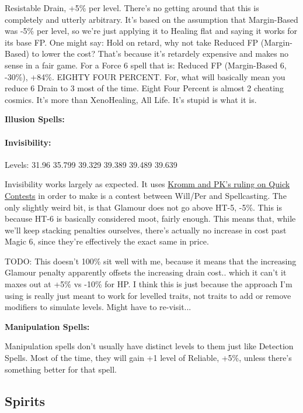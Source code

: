 \begin{multicols*}{2}
	Resistable Drain, +5\% per level. There's no getting around that this is completely and utterly arbitrary. It's based on the assumption that Margin-Based was -5\% per level, so we're just applying it to Healing flat and saying it works for its base FP. One might say: Hold on retard, why not take Reduced FP (Margin-Based) to lower the cost? That's because it's retardely expensive and makes no sense in a fair game. For a Force 6 spell that is: Reduced FP (Margin-Based 6, -30\%), +84\%. EIGHTY FOUR PERCENT. For, what will basically mean you reduce 6 Drain to 3 most of the time. Eight Four Percent is almost 2 cheating cosmics. It's more than XenoHealing, All Life. It's stupid is what it is.
	
	\textbf{Illusion Spells:}
	
	\paragraph{Invisibility:} Levels: 31.96 35.799 39.329 39.389 39.489 39.639
	
	Invisibility works largely as expected. It uses \href{http://forums.sjgames.com/showpost.php?p=669736&postcount=2}{Kromm and PK's ruling on Quick Contests} in order to make is a contest between Will/Per and Spellcasting. The only slightly weird bit, is that Glamour does not go above HT-5, -5\%. This is because HT-6 is basically considered moot, fairly enough. This means that, while we'll keep stacking penalties ourselves, there's actually no increase in cost past Magic 6, since they're effectively the exact same in price.
	
	TODO: This doesn't 100\% sit well with me, because it means that the increasing Glamour penalty apparently offsets the increasing drain cost.. which it can't it maxes out at +5\% vs -10\% for HP. I think this is just because the approach I'm using is really just meant to work for levelled traits, not traits to add or remove modifiers to simulate levels. Might have to re-visit...
	
	
	\textbf{Manipulation Spells:\\}
	
	Manipulation spells don't usually have distinct levels to them just like Detection Spells. Most of the time, they will gain +1 level of Reliable, +5\%, unless there's something better for that spell.
	
	
	\subsection{Spirits}
	

\end{multicols*}
